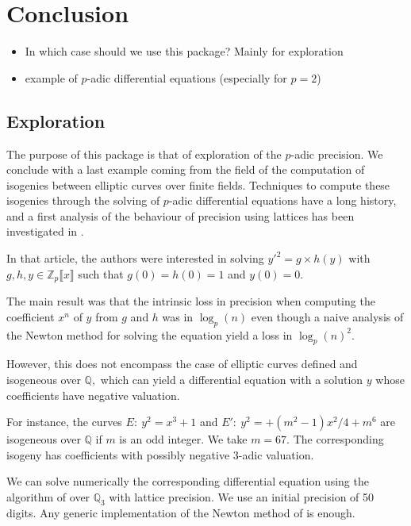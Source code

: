 \documentclass[sigconf]{acmart}
\theoremstyle{definition}
\begin{document}
\section{Conclusion}

\begin{itemize}
\item In which case should we use this package? Mainly for exploration
\item example of $p$-adic differential equations (especially for $p=2$)
\end{itemize}

\subsection{Exploration}

The purpose of this package is that of exploration
of the $p$-adic precision.
We conclude with a last example coming
from the field of the computation of
isogenies between elliptic curves over finite fields.
Techniques to compute these isogenies
through the solving of $p$-adic differential equations
have a long history, and a first
analysis of the behaviour of precision using
lattices has been investigated in \cite{LV16}.

In that article, the authors were interested in
solving $y'^2=g \times h(y)$ with
$g,h,y \in \mathbb{Z}_p \llbracket x \rrbracket$
such that $g(0)=h(0)=1$ and $y(0)=0.$

The main result was that the intrinsic loss in precision
when computing the coefficient $x^n$ of $y$
from $g$ and $h$ was in $\log_p(n)$
even though a naive analysis of
the Newton method for solving the equation
yield a loss in $\log_p(n)^2.$

However, this does not encompass the case of 
elliptic curves defined and isogeneous 
over $\mathbb{Q},$ which can yield a differential 
equation with a solution $y$ whose coefficients
have negative valuation.

For instance, the curves 
$E: \: y^2=x^3+1$
and $E': \: y^2=+ (m^2-1)x^2/4 + m^6$ are isogeneous
over $\mathbb{Q}$ if  $m$ is an odd integer.
We take $m=67.$ The corresponding isogeny has coefficients with possibly
negative $3$-adic valuation.

We can solve numerically 
the corresponding differential equation
using the algorithm of \cite{Lercier-Sirvent:08}
over $\mathbb{Q}_3$ with lattice precision.
We use an initial precision of 50 digits.
Any generic implementation of the Newton
method of \cite{Lercier-Sirvent:08} is enough.
\end{document}
